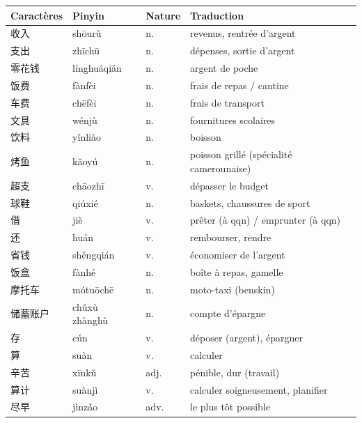 \documentclass[11pt]{article}
\begin{document}
\begin{center}
\begin{tabularx}{\linewidth}{|X|X|X|X|}
\hline
\rowcolor{popblueL} \textbf{Caractères} & \textbf{Pinyin} & \textbf{Nature} & \textbf{Traduction} \\
\hline
收入 & shōurù & n. & revenus, rentrée d'argent \\
支出 & zhīchū & n. & dépenses, sortie d'argent \\
零花钱 & línghuáqián & n. & argent de poche \\
饭费 & fànfèi & n. & frais de repas / cantine \\
车费 & chēfèi & n. & frais de transport \\
文具 & wénjù & n. & fournitures scolaires \\
饮料 & yǐnliào & n. & boisson \\
烤鱼 & kǎoyú & n. & poisson grillé (spécialité camerounaise) \\
超支 & chāozhī & v. & dépasser le budget \\
球鞋 & qiúxié & n. & baskets, chaussures de sport \\
借 & jiè & v. & prêter (à qqn) / emprunter (à qqn) \\
还 & huán & v. & rembourser, rendre \\
省钱 & shěngqián & v. & économiser de l'argent \\
饭盒 & fànhé & n. & boîte à repas, gamelle \\
摩托车 & mótuōchē & n. & moto-taxi (benskin) \\
储蓄账户 & chǔxù zhànghù & n. & compte d'épargne \\
存 & cún & v. & déposer (argent), épargner \\
算 & suàn & v. & calculer \\
辛苦 & xīnkǔ & adj. & pénible, dur (travail) \\
算计 & suànjì & v. & calculer soigneusement, planifier \\
尽早 & jìnzǎo & adv. & le plus tôt possible \\
\hline
\end{tabularx}
\end{center}
\end{document}
